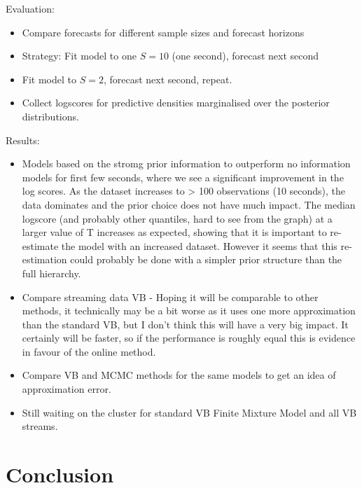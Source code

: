\documentclass[12pt,a4paper]{article}\usepackage[]{graphicx}\usepackage[]{color}
\begin{document}
Evaluation:
\begin{itemize}
\item Compare forecasts for different sample sizes and forecast horizons
\item Strategy: Fit model to one $S = 10$ (one second), forecast next second
\item Fit model to $S = 2$, forecast next second, repeat.
\item Collect logscores for predictive densities marginalised over the posterior distributions.
\end{itemize}

Results:
\begin{itemize}
\item Models based on the stromg prior information to outperform no information models for first few seconds, where we see a significant improvement in the log scores. As the dataset increases to > 100 observations (10 seconds), the data dominates and the prior choice does not have much impact. The median logscore (and probably other quantiles, hard to see from the graph) at a larger value of T increases as expected, showing that it is important to re-estimate the model with an increased dataset. However it seems that this re-estimation could probably be done with a simpler prior structure than the full hierarchy. 
\item Compare streaming data VB - Hoping it will be comparable to other methods, it technically may be a bit worse as it uses one more approximation than the standard VB, but I don't think this will have a very big impact. It certainly will be faster, so if the performance is roughly equal this is evidence in favour of the online method. 
\item Compare VB and MCMC methods for the same models to get an idea of approximation error.
\item Still waiting on the cluster for standard VB Finite Mixture Model and all VB streams.
\end{itemize}

\section{Conclusion}
\end{document}
